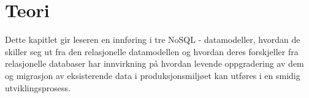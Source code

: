 
\chapter{Teori}
Dette kapitlet gir leseren en innføring i tre NoSQL - datamodeller, hvordan de skiller seg ut fra den relasjonelle datamodellen og hvordan deres forskjeller fra relasjonelle databaser har innvirkning på hvordan levende oppgradering av dem og migrasjon av eksisterende data i produksjonsmiljøet kan utføres i en smidig utviklingsprosess.





\cleardoublepage